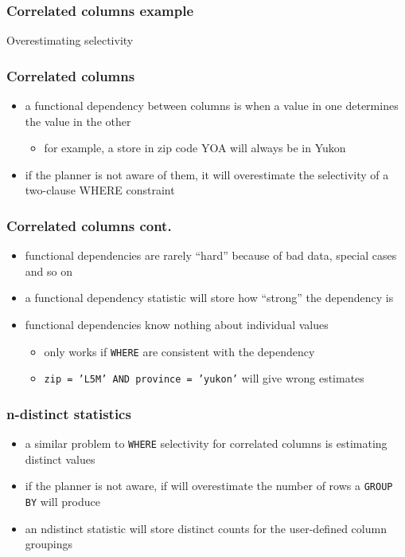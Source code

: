 \documentclass{beamer}
\begin{document}
\begin{frame}
  \frametitle{Correlated columns example}

  \begin{block}{Overestimating selectivity}
    
  \end{block}
\end{frame}

\begin{frame}
  \frametitle{Correlated columns}

  \begin{itemize}
  \item a \alert{functional dependency} between columns is when a value in one
    \alert{determines} the value in the other
    \begin{itemize}
    \item for example, a store in zip code YOA will \alert{always} be in Yukon
    \end{itemize}
  \item if the planner is not aware of them, it will \alert{overestimate} the
    selectivity of a two-clause WHERE constraint
  \end{itemize}
\end{frame}

\begin{frame}
  \frametitle{Correlated columns cont.}

  \begin{itemize}
  \item functional dependencies are rarely \alert{``hard''} because of bad
    data, special cases and so on
  \item a functional dependency statistic will store how
    \alert{``strong''} the dependency is
  \item functional dependencies know nothing about \alert{individual values}
    \begin{itemize}
    \item only works if \texttt{WHERE} are \alert{consistent} with the dependency
    \item \texttt{zip = 'L5M' AND province = 'yukon'} will give \alert{wrong}
      estimates
    \end{itemize}
  \end{itemize}
\end{frame}

\begin{frame}
  \frametitle{n-distinct statistics}

  \begin{itemize}
  \item a similar problem to \texttt{WHERE} selectivity for correlated columns
    is estimating \alert{distinct values}
  \item if the planner is not aware, if will \alert{overestimate} the number of rows a \texttt{GROUP BY} will produce
  \item an \alert{ndistinct} statistic will store distinct counts for the
    user-defined \alert{column groupings}
  \end{itemize}
\end{frame}
\end{document}
